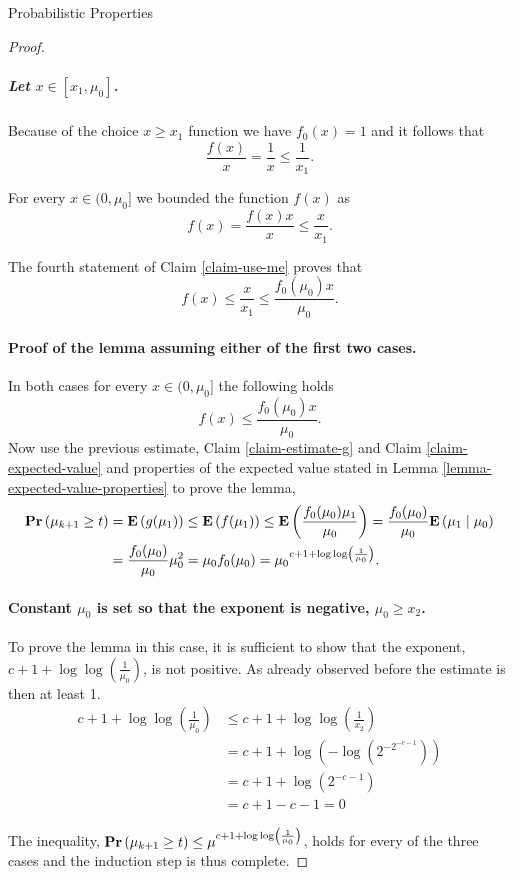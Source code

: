 \begin{section}{Probabilistic Properties}
\begin{proof}
\subparagraph{Let $x \in [x_1, \mu_0]$.} Because of the choice $x \geq x_1$ function we have $f_0(x) = 1$ and it follows that 
\[ 
	\frac{f(x)}{x} = \frac{1}{x} \leq \frac{1}{x_1} \text{.}
\]

For every $x \in (0, \mu_0]$ we bounded the function $f(x)$ as \[f(x) = \frac{f(x)x}{x} \leq \frac{x}{x_1} \text{.} \]

The fourth statement of Claim \ref{claim-use-me} proves that
\[
	f(x) \leq \frac{x}{x_1} \leq \frac{f_0(\mu_0)x}{\mu_0} \text{.}
\]

\paragraph{Proof of the lemma assuming either of the first two cases.}
In both cases for every $x \in (0, \mu_0]$ the following holds \[ f(x) \leq \frac{f_0(\mu_0)x}{\mu_0} \text{.} \] Now use the previous estimate, Claim \ref{claim-estimate-g} and Claim \ref{claim-expected-value} and properties of the expected value stated in Lemma \ref{lemma-expected-value-properties} to prove the lemma,
\[
\begin{split}
\mathbf{Pr}\left(\mu_{k + 1} \geq t\right)
	& = \mathbf{E}\left(g(\mu_1)\right) \leq \mathbf{E}\left(f(\mu_1)\right) \leq \mathbf{E}\left(\frac{f_0(\mu_0)\mu_1}{\mu_0}\right) = \frac{f_0(\mu_0)}{\mu_0}\mathbf{E}\left(\mu_1 \mid \mu_0\right) \\
	& = \frac{f_0(\mu_0)}{\mu_0}\mu_0 ^ 2 = \mu_0 f_0(\mu_0) = {\mu_0}^{c + 1 + \log \log \left(\frac{1}{\mu_0}\right)} \text{.}
\end{split}
\]

\paragraph{Constant $\mu_0$ is set so that the exponent is negative, $\mu_0 \geq x_2$.}
To prove the lemma in this case, it is sufficient to show that the exponent, $c + 1 + \log \log \left( \frac{1}{\mu_0} \right)$, is not positive. As already observed before the estimate is then at least 1.
\[
\begin{split}
	c + 1 + \log \log \left( \frac{1}{\mu_0} \right) 
		& \leq c + 1 + \log \log \left( \frac{1}{x_2} \right) \\ 
		& = c + 1 + \log \left(- \log \left(2 ^ {-2 ^ {-c - 1}}\right)\right) \\ 
		& = c + 1 + \log \left(2 ^ {-c - 1}\right) \\ 
		& = c + 1 - c - 1 = 0
\end{split}
\]

The inequality, $\mathbf{Pr}\left(\mu_{k + 1} \geq t\right) \leq \mu ^ {c + 1 + \log \log \left( \frac{1}{\mu_0} \right)}$, holds for every of the three cases and the induction step is thus complete.
\end{proof}


\end{section}

